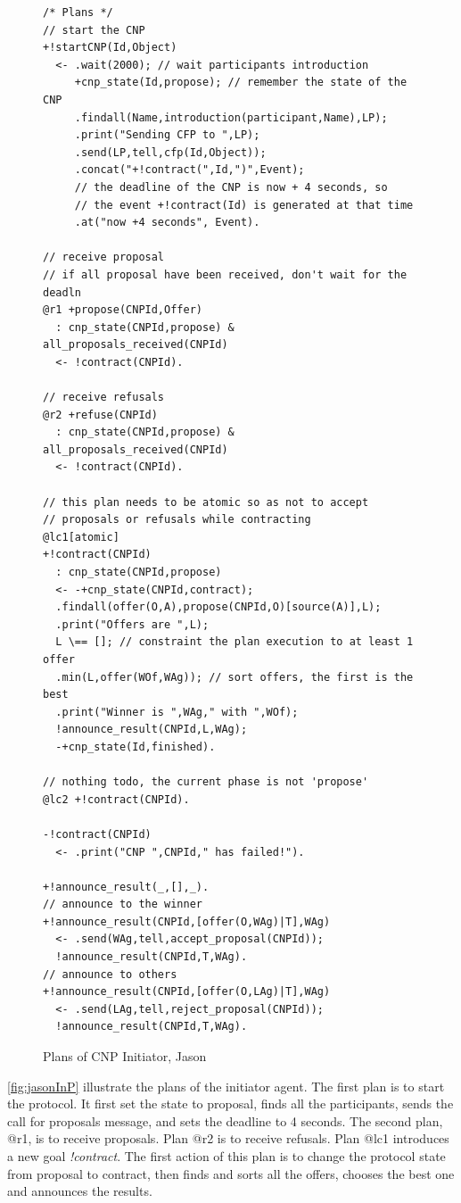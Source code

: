 \documentclass[a4paper,12pt,oneside,fleqn]{book} %
\begin{document}
\begin{figure}\footnotesize %
\begin{verbatim}
/* Plans */
// start the CNP
+!startCNP(Id,Object)
  <- .wait(2000); // wait participants introduction
     +cnp_state(Id,propose); // remember the state of the CNP
     .findall(Name,introduction(participant,Name),LP);
     .print("Sending CFP to ",LP);
     .send(LP,tell,cfp(Id,Object));
     .concat("+!contract(",Id,")",Event);
     // the deadline of the CNP is now + 4 seconds, so
     // the event +!contract(Id) is generated at that time
     .at("now +4 seconds", Event).

// receive proposal
// if all proposal have been received, don't wait for the deadln
@r1 +propose(CNPId,Offer)
  : cnp_state(CNPId,propose) & all_proposals_received(CNPId)
  <- !contract(CNPId).

// receive refusals
@r2 +refuse(CNPId)
  : cnp_state(CNPId,propose) & all_proposals_received(CNPId)
  <- !contract(CNPId).

// this plan needs to be atomic so as not to accept
// proposals or refusals while contracting
@lc1[atomic]
+!contract(CNPId)
  : cnp_state(CNPId,propose)
  <- -+cnp_state(CNPId,contract);
  .findall(offer(O,A),propose(CNPId,O)[source(A)],L);
  .print("Offers are ",L);
  L \== []; // constraint the plan execution to at least 1 offer
  .min(L,offer(WOf,WAg)); // sort offers, the first is the best
  .print("Winner is ",WAg," with ",WOf);
  !announce_result(CNPId,L,WAg);
  -+cnp_state(Id,finished).

// nothing todo, the current phase is not 'propose'
@lc2 +!contract(CNPId).

-!contract(CNPId)
  <- .print("CNP ",CNPId," has failed!").

+!announce_result(_,[],_).
// announce to the winner
+!announce_result(CNPId,[offer(O,WAg)|T],WAg)
  <- .send(WAg,tell,accept_proposal(CNPId));
  !announce_result(CNPId,T,WAg).
// announce to others
+!announce_result(CNPId,[offer(O,LAg)|T],WAg)
  <- .send(LAg,tell,reject_proposal(CNPId));
  !announce_result(CNPId,T,WAg).
\end{verbatim}
\caption{Plans of CNP Initiator, Jason}
\label{fig:jasonInP}
\end{figure} %

\autoref{fig:jasonInP} illustrate the plans of the initiator agent. The
first plan is to start the protocol. It first set the state to proposal,
finds all the participants, sends the call for proposals message, and sets
the deadline to 4 seconds. The second plan, @r1, is to receive proposals.
Plan @r2 is to receive refusals. Plan @lc1 introduces a new goal
\textit{!contract}. The first action of this plan is to change the protocol
state from proposal to contract, then finds and sorts all the offers,
chooses the best one and announces the results.
\end{document}
